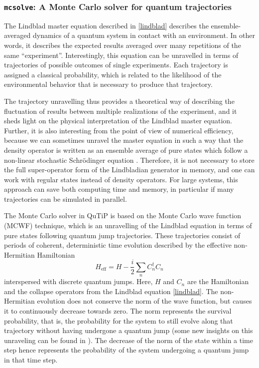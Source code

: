 \documentclass[preprint,3p,sort&compress]{elsarticle}
\def\code#1{\texttt{#1}}
\begin{document}
\subsubsection{\textup{\code{mcsolve}}: A Monte Carlo solver for quantum trajectories}

The Lindblad master equation described in \eqref{lindblad} describes the ensemble-averaged dynamics of a quantum system in contact with an environment. In other words, it describes the expected results averaged over many repetitions of the same ``experiment''.  Interestingly, this equation can be unravelled in terms of trajectories of possible outcomes of single experiments. Each trajectory is assigned a classical probability, which is related to the likelihood of the environmental behavior that is necessary to produce that trajectory.

The trajectory unravelling thus provides a theoretical way of describing the fluctuation of results between multiple realizations of the experiment, and it sheds light on the physical interpretation of the Lindblad master equation. Further, it is also interesting from the point of view of numerical efficiency, because we can sometimes unravel the master equation in such a way that the density operator is written as an ensemble average of pure states which follow a non-linear stochastic Schr\"odinger equation \cite{mc1}. Therefore, it is not necessary to store the full super-operator form of the Lindbladian generator in memory, and one can work with regular states instead of density operators.  For large systems, this approach can save both computing time and memory, in particular if many trajectories can be simulated in parallel.

The Monte Carlo solver in QuTiP is based on the Monte Carlo wave function (MCWF) technique, which is an unravelling of the Lindblad equation in terms of pure states following quantum jump trajectories. These trajectories consist of periods of coherent, deterministic time evolution  described by the effective non-Hermitian Hamiltonian
\begin{equation} \label{heff}
H_{\mathrm{eff}} = H - \frac{i}{2} \sum_n C_n^{\dagger}C_n 
\end{equation}
interspersed with discrete quantum jumps. Here, $H$ and $C_n$ are the Hamiltonian and the collapse operators from the Lindblad equation \eqref{lindblad}.  The non-Hermitian evolution does not conserve the norm of the wave function, but causes it to continuously decrease towards zero.  The norm represents the survival probability, that is, the probability for the system to still evolve along that trajectory without having undergone a quantum jump (some new insights on this unraveling can be found in \cite{PhysRevResearch.4.023036, PhysRevA.104.062212}). The decrease of the norm of the state within a time step hence represents the probability of the system undergoing a quantum jump in that time step. %
\end{document}
